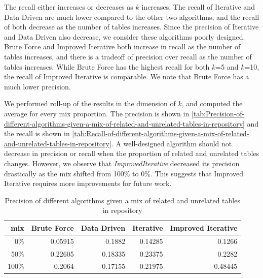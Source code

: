 The recall either increases or decreases as $k$ increases. The recall of Iterative and Data Driven are much lower compared to the other two algorithms, and the recall of both decrease as the number of tables increases. Since the precision of Iterative and Data Driven also decrease, we consider these algorithms poorly designed. Brute Force and Improved Iterative both increase in recall as the number of tables increases, and there is a tradeoff of precision over recall as the number of tables increases. While Brute Force has the highest recall for both $k$=5 and $k$=10, the recall of Improved Iterative is comparable. We note that Brute Force has a much lower precision.

We performed roll-up of the results in the dimension of $k$, and computed the average for every mix proportion. The precision is shown in \autoref{tab:Precision-of-different-algorithms-given-a-mix-of-related-and-unrelated-tables-in-repository} and the recall is shown in \autoref{tab:Recall-of-different-algorithms-given-a-mix-of-related-and-unrelated-tables-in-repository}. A well-designed algorithm should not decrease in precision or recall when the proportion of related and unrelated tables changes. However, we observe that \textit{ImprovedIterative} decreased its precision drastically as the mix shifted from 100\% to 0\%. This suggests that Improved Iterative requires more improvements for future work.

\begin{table}[ht!]
    \centering
    \scriptsize
    \begin{center}
      \caption{Precision of different algorithms given a mix of related and unrelated tables in repository}
      \label{tab:Precision-of-different-algorithms-given-a-mix-of-related-and-unrelated-tables-in-repository}
      \begin{tabular}{|r|r|r|r|r|}
        \hline
        \textbf{mix} & \textbf{Brute Force} & \textbf{Data Driven} & \textbf{Iterative} & \textbf{Improved Iterative} \\
        \hline
        0\% & 0.05915 & 0.1882 & 0.14285 & 0.1266 \\
        \hline
        50\% & 0.22605 & 0.18335 & 0.23375 & 0.2282 \\
        \hline
        100\% & 0.2064 & 0.17155 & 0.21975 & 0.48445 \\
        \hline
      \end{tabular}
    \end{center}
\end{table}


